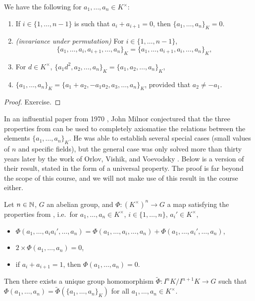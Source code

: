 \documentclass[12pt, leqno, british]{amsart}
\begin{document}
\begin{cor}\label{C:K-theory-axioms}
We have the following for $a_1, \ldots, a_n \in K^\times$:
\begin{enumerate}
\item If $i \in \lbrace 1, \ldots, n-1 \rbrace$ is such that $a_i + a_{i+1} = 0$, then $\lbrace a_1, \ldots, a_n \rbrace_K = 0$.
\item\label{it:permutation-invariance} \textit{(invariance under permutation)} For $i \in \lbrace 1, \ldots, n-1 \rbrace$, $$\lbrace a_1, \ldots, a_i, a_{i+1}, \ldots, a_n \rbrace_K = \lbrace a_1, \ldots, a_{i+1}, a_i, \ldots, a_n \rbrace_K,$$
\item For $d \in K^\times$, $\lbrace a_1d^2, a_2, \ldots, a_n \rbrace_K = \lbrace a_1, a_2, \ldots, a_n \rbrace_K$,
\item $\lbrace a_1, \ldots, a_n \rbrace_K = \lbrace a_1 + a_2, -a_1a_2, a_3, \ldots, a_n \rbrace_K$, provided that $a_2 \neq -a_1$.
\end{enumerate}
\end{cor}
\begin{proof}
Exercise.
\end{proof}
In an influential paper from 1970 \cite{Milnor}, John Milnor conjectured that the three properties from  can be used to completely axiomatise the relations between the elements $\lbrace a_1, \ldots, a_n \rbrace_K$.
He was able to establish several special cases (small values of $n$ and specific fields), but the general case was only solved more than thirty years later by the work of Orlov, Vishik, and Voevodsky \cite{OrlovVishikVoevodsky}.
Below is a version of their result, stated in the form of a universal property.
The proof is far beyond the scope of this course, and we will not make use of this result in the course either.
\begin{thm}
Let $n \in \mathbb N$, $G$ an abelian group, and $\Phi : (K^\times)^n \to G$ a map satisfying the properties from , i.e.~for $a_1, \ldots, a_n \in K^\times$, $i \in \lbrace 1, \ldots, n \rbrace$, $a_i' \in K^\times$,
\begin{itemize}
\item $\Phi(a_1, \ldots, a_ia_i', \ldots, a_n) = \Phi(a_1, \ldots, a_i, \ldots, a_n) + \Phi(a_1, \ldots, a_i', \ldots, a_n)$,
\item $2 \times \Phi(a_1, \ldots, a_n) = 0$,
\item if $a_i + a_{i+1} = 1$, then $\Phi(a_1, \ldots, a_n) = 0$.
\end{itemize}
Then there exists a unique group homomorphism $\tilde{\Phi} : I^nK/I^{n+1}K \to G$ such that $\Phi(a_1, \ldots, a_n) = \tilde{\Phi}(\lbrace a_1, \ldots, a_n \rbrace_K)$ for all $a_1, \ldots, a_n \in K^\times$.
\end{thm}
\end{document}
